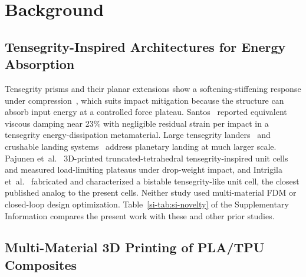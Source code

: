 \documentclass[lineno,nocopyright,upint,varvw,hyphenate]{asmejour}
\newcommand{\siref}[1]{\ref*{si-#1}}
\begin{document}
\section{Background}
\label{sec:background}

\subsection{Tensegrity-Inspired Architectures for Energy Absorption}

Tensegrity prisms and their planar extensions show a softening-stiffening
response under compression~\citep{amendola2014experimental,
zhang2018tensegrity, fraternali2015tensegrity}, which suits impact
mitigation because the structure can absorb input energy at a controlled
force plateau. Santos~\cite{santos2023towardanovel} reported equivalent
viscous damping near 23\% with negligible residual strain per impact in a
tensegrity energy-dissipation metamaterial. Large tensegrity
landers~\citep{agogino2018superball, caluwaerts2014superball,
sabelhaus2015system, vespignani2018design, deitrich2022titan} and
crushable landing systems~\citep{cloutier1966landing,
adams2004merairbag, jackson2014honeycomb} address planetary landing at
much larger scale. Pajunen et~al.~\cite{pajunen2019design} 3D-printed
truncated-tetrahedral tensegrity-inspired unit cells and measured
load-limiting plateaus under drop-weight impact, and Intrigila
et~al.~\cite{intrigila2022fabricationandexperimental} fabricated and
characterized a bistable tensegrity-like unit cell, the closest published
analog to the present cells. Neither study used multi-material FDM or
closed-loop design optimization. Table~\siref{tab:si-novelty} of the
Supplementary Information compares the present work with these and
other prior studies.

\subsection{Multi-Material 3D Printing of PLA/TPU Composites}
\end{document}
